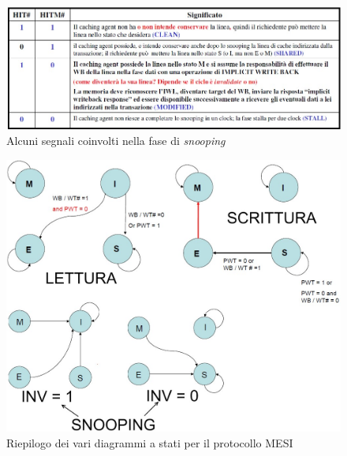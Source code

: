 \begin{figure}[!h]
\centering
\includegraphics[width=\columnwidth]{img/SegnaliFaseSnooping}
\caption{Alcuni segnali coinvolti nella fase di \textit{snooping}}
\label{fig:SegnaliFaseSnooping}
\end{figure}

\begin{figure}[!h]
\centering
\includegraphics[width=\columnwidth]{img/stateDiagramMESI}
\caption{Riepilogo dei vari diagrammi a stati per il protocollo MESI}
\label{fig:stateDiagramMESI}
\end{figure}
